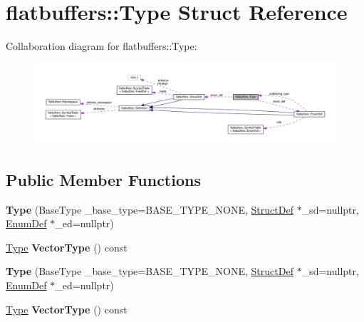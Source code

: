 \hypertarget{structflatbuffers_1_1Type}{}\section{flatbuffers\+:\+:Type Struct Reference}
\label{structflatbuffers_1_1Type}


Collaboration diagram for flatbuffers\+:\+:Type\+:
\nopagebreak
\begin{figure}[H]
\begin{center}
\leavevmode
\includegraphics[width=350pt]{structflatbuffers_1_1Type__coll__graph}
\end{center}
\end{figure}
\subsection*{Public Member Functions}
\begin{DoxyCompactItemize}
\item 
\mbox{\label{structflatbuffers_1_1Type_a39a5a79b6d91d547873aa66079b75339}} 
{\bfseries Type} (Base\+Type \+\_\+base\+\_\+type=B\+A\+S\+E\+\_\+\+T\+Y\+P\+E\+\_\+\+N\+O\+NE, \hyperlink{structflatbuffers_1_1StructDef}{Struct\+Def} $\ast$\+\_\+sd=nullptr, \hyperlink{structflatbuffers_1_1EnumDef}{Enum\+Def} $\ast$\+\_\+ed=nullptr)
\item 
\mbox{\label{structflatbuffers_1_1Type_a639a6a58a13631b80f00c20725472c7c}} 
\hyperlink{structflatbuffers_1_1Type}{Type} {\bfseries Vector\+Type} () const
\item 
\mbox{\label{structflatbuffers_1_1Type_a39a5a79b6d91d547873aa66079b75339}} 
{\bfseries Type} (Base\+Type \+\_\+base\+\_\+type=B\+A\+S\+E\+\_\+\+T\+Y\+P\+E\+\_\+\+N\+O\+NE, \hyperlink{structflatbuffers_1_1StructDef}{Struct\+Def} $\ast$\+\_\+sd=nullptr, \hyperlink{structflatbuffers_1_1EnumDef}{Enum\+Def} $\ast$\+\_\+ed=nullptr)
\item 
\mbox{\label{structflatbuffers_1_1Type_a639a6a58a13631b80f00c20725472c7c}} 
\hyperlink{structflatbuffers_1_1Type}{Type} {\bfseries Vector\+Type} () const
\end{DoxyCompactItemize}
